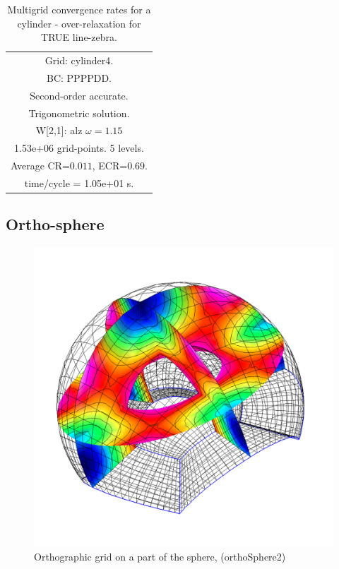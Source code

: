 \begin{table}[hbt]
\begin{center}
\begin{tabular}{|c|c|c|c|c|}
\hline 
\multicolumn{5}{|c|}{Grid: cylinder4.}  \\
\multicolumn{5}{|c|}{BC: PPPPDD.}  \\
\multicolumn{5}{|c|}{Second-order accurate.}  \\
\multicolumn{5}{|c|}{Trigonometric solution.}  \\
\multicolumn{5}{|c|}{W[2,1]: alz $\omega=1.15$}  \\
\multicolumn{5}{|c|}{1.53e+06 grid-points. 5 levels.}  \\
\multicolumn{5}{|c|}{Average CR=$0.011$, ECR=$0.69$.}  \\
\multicolumn{5}{|c|}{time/cycle = 1.05e+01 s.}  \\
\hline 
\end{tabular}
\qquad
\end{center}
\caption{Multigrid convergence rates for a cylinder - over-relaxation for TRUE line-zebra.}
\label{fig:cylinder}
\end{table}

\clearpage
\subsection{Ortho-sphere}

\begin{figure}[hbt]
\begin{center}
  \includegraphics[width=.75\linewidth]{fig/orthoSphere2_u}
  \end{center} 
\caption{Orthographic grid on a part of the sphere, (orthoSphere2)}
\label{fig:orthoSphere2}
\end{figure}


